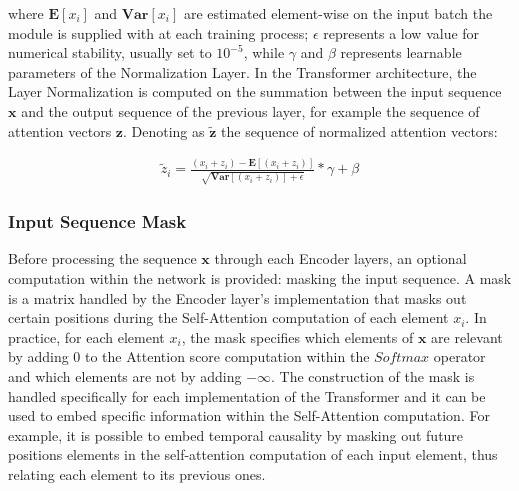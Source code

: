                 where $\mathbf{E} \left[ x_{i} \right]$ and $\mathbf{Var} \left[ x_{i} \right]$ are estimated element-wise on the input batch the module is supplied with at each training process; $\epsilon$ represents a low value for numerical stability, usually set to $10^{-5}$, while $\gamma$ and $\beta$ represents learnable parameters of the Normalization Layer. \newline
                In the Transformer architecture, the Layer Normalization is computed on the summation between the input sequence $\mathbf{x}$ and the output sequence of the previous layer, for example the sequence of attention vectors $\mathbf{z}$. Denoting as $\mathbf{\tilde{z}}$ the sequence of normalized attention vectors:
                
                \begin{align*}
                    \tilde{z}_{i} = \frac{ (x_{i} + z_{i}) - \mathbf{E} \left[ (x_{i} + z_{i}) \right]}{\sqrt{\mathbf{Var} \left[ (x_{i} + z_{i}) \right] + \epsilon}} * \gamma + \beta
                \end{align*}
            
            \subsubsection{Input Sequence Mask}
                Before processing the sequence $\mathbf{x}$ through each Encoder layers, an optional computation within the network is provided: masking the input sequence. A mask is a matrix handled by the Encoder layer's implementation that masks out certain positions during the Self-Attention computation of each element $x_{i}$. In practice, for each element $x_{i}$, the mask specifies which elements of $\mathbf{x}$ are relevant by adding 0 to the Attention score computation within the $Softmax$ operator and which elements are not by adding $-\infty$. \newline
                The construction of the mask is handled specifically for each implementation of the Transformer and it can be used to embed specific information within the Self-Attention computation. For example, it is possible to embed temporal causality by masking out future positions elements in the self-attention computation of each input element, thus relating each element to its previous ones.
            
